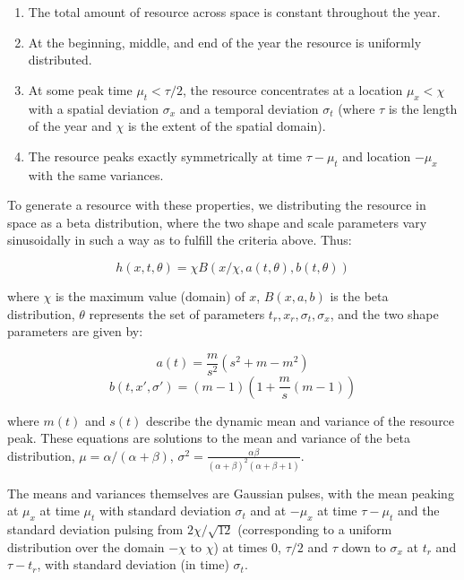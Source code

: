 \documentclass[utf8]{frontiersSCNS} %
\begin{document}
	\begin{enumerate}
		\item The total amount of resource across space is constant throughout the year.
		\item At the beginning, middle, and end of the year the resource is uniformly distributed. 
		\item At some peak time $\mu_t < \tau/2$, the resource concentrates at a location $\mu_x < \chi$ with a spatial deviation $\sigma_x$ and a temporal deviation $\sigma_t$ (where $\tau$ is the length of the year and $\chi$ is the extent of the spatial domain).
		\item The resource peaks exactly symmetrically at time $\tau - \mu_t$ and location $-\mu_x$ with the same variances.
	\end{enumerate}
	
	To generate a resource with these properties, we distributing the resource in space as a beta distribution, where the two shape and scale parameters vary sinusoidally in such a way as to fulfill the criteria above.  Thus:
	
	$$h(x,t, \theta) = \chi B(x/\chi, a(t, \theta), b(t, \theta))$$
	
	where $\chi$ is the maximum value (domain) of $x$, $B(x, a, b)$ is the beta distribution, $\theta$ represents the set of parameters $t_r, x_r, \sigma_t, \sigma_x$, and the two shape parameters are given by:
	
	$$a(t) = \frac{m}{s^2}( s^2 + m - m^2)$$
	$$b(t, x', \sigma') = (m-1)\left(1 + \frac{m}{s}(m-1)\right) $$
	
	where $m(t)$ and $s(t)$ describe the dynamic mean and variance of the resource peak.  These equations are solutions to the mean and variance of the beta distribution, $\mu = \alpha/(\alpha + \beta)$, $\sigma^2 = \frac{\alpha\beta}{(\alpha+\beta)^2(\alpha+\beta+1)}$.
	
	The means and variances themselves are Gaussian pulses, with the mean peaking at $\mu_x$ at time $\mu_t$ with standard deviation $\sigma_t$ and at $-\mu_x$ at time $\tau - \mu_t$ and the standard deviation pulsing from $2 \chi/\sqrt{12}$ (corresponding to a uniform distribution over the domain $-\chi$ to $\chi$) at times 0, $\tau/2$ and $\tau$ down to $\sigma_x$ at $t_r$ and $\tau - t_r$, with standard deviation (in time) $\sigma_t$. 
	
	
\end{document}
